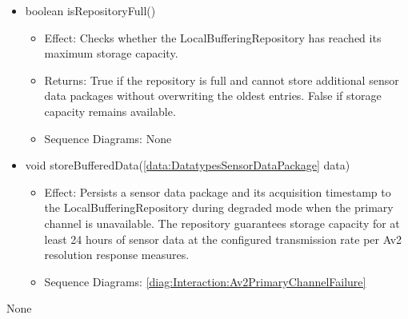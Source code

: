 \begin{description}
\begin{itemize}[noitemsep,nolistsep,leftmargin=-.25cm]
\begin{itemize}[noitemsep,nolistsep]
           \item Sequence Diagrams: \cref{diag:Interaction:Av2PrimaryChannelFailure,diag:Interaction:Recoveryfromdegradedmode}
        \end{itemize}
      \item \textsf{boolean isRepositoryFull()}
        \begin{itemize}[noitemsep,nolistsep]
           \item Effect: Checks whether the LocalBufferingRepository has reached its maximum storage capacity. 
           \item Returns: True if the repository is full and cannot store additional sensor data packages without overwriting the oldest entries. False if storage capacity remains available.
           \item Sequence Diagrams: None
        \end{itemize}
      \item \textsf{void storeBufferedData(\ref{data:DatatypesSensorDataPackage} data)}
        \begin{itemize}[noitemsep,nolistsep]
           \item Effect: Persists a sensor data package and its acquisition timestamp to the LocalBufferingRepository during degraded mode when the primary channel is unavailable. The repository guarantees storage capacity for at least 24 hours of sensor data at the configured transmission rate per Av2 resolution response measures. 
           \item Sequence Diagrams: \cref{diag:Interaction:Av2PrimaryChannelFailure}
        \end{itemize}
    \end{itemize}
      \item[Diagrams:] None
    \end{description}

